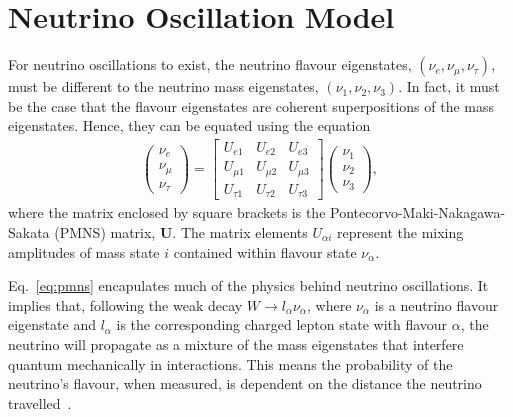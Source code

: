 \documentclass[aps,pra,12pt,notitlepage,tightenlines]{revtex4-1}
\newcommand\matr[1]{\bm{#1}}
\begin{document}
\section{Neutrino Oscillation Model}
\label{sec:osc}
For neutrino oscillations to exist, the neutrino flavour eigenstates, $(\nu_e, \nu_\mu, \nu_\tau)$, must be different to the neutrino mass eigenstates, $(\nu_1, \nu_2, \nu_3)$. In fact, it must be the case that the flavour eigenstates are coherent superpositions of the mass eigenstates. Hence, they can be equated using the equation
\begin{gather}
\label{eq:pmns}
 \begin{pmatrix}
 \nu_e \\
 \nu_\mu \\
 \nu_\tau 
 \end{pmatrix}
 =
 \begin{bmatrix}
 U_{e1} & U_{e2} & U_{e3} \\
 U_{\mu1} & U_{\mu2} & U_{\mu3} \\
 U_{\tau1} & U_{\tau2} & U_{\tau3}
 \end{bmatrix}
 \begin{pmatrix}
  \nu_1 \\
 \nu_2 \\
 \nu_3 
 \end{pmatrix}
 ,
\end{gather}
where the matrix enclosed by square brackets is the Pontecorvo-Maki-Nakagawa-Sakata (PMNS) matrix, $\matr{U}$. The matrix elements $U_{\alpha i}$ represent the mixing amplitudes of mass state $i$ contained within flavour state $\nu_\alpha$.

Eq.\ \eqref{eq:pmns} encapulates much of the physics behind neutrino oscillations. It implies that, following the weak decay $W \rightarrow l_\alpha\nu_\alpha$, where $\nu_\alpha$ is a neutrino flavour eigenstate and $l_\alpha$ is the corresponding charged lepton state with flavour $\alpha$, the neutrino will propagate as a mixture of the mass eigenstates that interfere quantum mechanically in interactions. This means the probability of the neutrino's flavour, when measured, is dependent on the distance the neutrino travelled~\cite{Kayser:2005cd}. 
\end{document}
